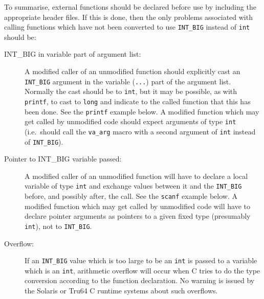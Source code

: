 \documentclass[twoside,11pt,nolof]{starlink}
\providecommand{\cc}[1]{\texttt{#1}}
\begin{document}
To summarise, external functions should be declared before use by
including the appropriate header files.  If this is done, then the only
problems associated with calling functions which have not been
converted to use \cc{INT\_BIG} instead of \cc{int} should be:
\begin{description}
%
\item[INT\_BIG in variable part of argument list:]
A modified caller of an unmodified function should explicitly cast
an \cc{INT\_BIG} argument in the variable (\cc{...}) part of the argument
list.
Normally the cast should be to \cc{int}, but it may be possible,
as with \cc{printf}, to cast to \cc{long} and indicate to the called
function that this has been done.
See the \cc{printf} example below.
A modified function which may get called by unmodified code
should expect arguments of type \cc{int}
(i.e.\ should call the \cc{va\_arg} macro with a second argument
of \cc{int} instead of \cc{INT\_BIG}).
%
\item[Pointer to INT\_BIG variable passed:]
A modified caller of an unmodified function will have to declare
a local variable of type \cc{int} and exchange values between it
and the \cc{INT\_BIG} before, and possibly after, the call.
See the \cc{scanf} example below.
A modified function which may get called by unmodified code
will have to declare pointer arguments as pointers to a given fixed
type (presumably \cc{int}), not to \cc{INT\_BIG}.
\item[Overflow:]
If an \cc{INT\_BIG} value which is too large to be an \cc{int}
is passed to a variable which is an \cc{int}, arithmetic overflow will
occur when C tries to do the type conversion according to the function
declaration.
No warning is issued by the Solaris or Tru64 C runtime systems about
such overflows.
\end{description}
\end{document}
